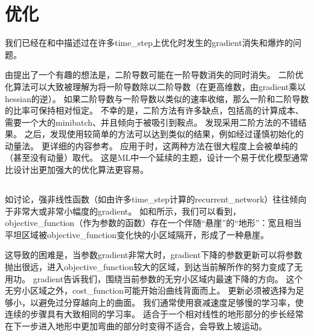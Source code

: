 \section{优化}
\label{sec:optimization_for_long_term_dependencies}
我们已经在和中描述过在许多\gls{time_step}上优化时发生的\gls{gradient}消失和爆炸的问题。

由\cite{Martens+Sutskever-ICML2011}提出了一个有趣的想法是，二阶导数可能在一阶导数消失的同时消失。
二阶优化算法可以大致被理解为将一阶导数除以二阶导数（在更高维数，由\gls{gradient}乘以\gls{hessian}的逆）。
如果二阶导数与一阶导数以类似的速率收缩，那么一阶和二阶导数的比率可保持相对恒定。
不幸的是，二阶方法有许多缺点，包括高的计算成本、需要一个大的\gls{minibatch}、并且倾向于被吸引到鞍点。
\cite{Martens+Sutskever-ICML2011}发现采用二阶方法的不错结果。
之后，\cite{sutskeverimportance}发现使用较简单的方法可以达到类似的结果，例如经过谨慎初始化的动量法。
更详细的内容参考\cite{Sutskever-thesis2012}。
应用于时，这两种方法在很大程度上会被单纯的（甚至没有动量）取代。
这是\gls{ML}中一个延续的主题，设计一个易于优化模型通常比设计出更加强大的优化算法更容易。


\subsection{}
\label{sec:clipping_gradients}
如讨论，强非线性函数（如由许多\gls{time_step}计算的\gls{recurrent_network}）往往倾向于非常大或非常小幅度的\gls{gradient}。
如和所示，我们可以看到，\gls{objective_function}（作为参数的函数）存在一个伴随``悬崖''的``地形''：宽且相当平坦区域被\gls{objective_function}变化快的小区域隔开，形成了一种悬崖。

这导致的困难是，当参数\gls{gradient}非常大时，\gls{gradient}下降的参数更新可以将参数抛出很远，进入\gls{objective_function}较大的区域，到达当前解所作的努力变成了无用功。
\gls{gradient}告诉我们，围绕当前参数的无穷小区域内最速下降的方向。
这个无穷小区域之外，\gls{cost_function}可能开始沿曲线背面而上。
更新必须被选择为足够小，以避免过分穿越向上的曲面。
我们通常使用衰减速度足够慢的学习率，使连续的步骤具有大致相同的学习率。
适合于一个相对线性的地形部分的步长经常在下一步进入地形中更加弯曲的部分时变得不适合，会导致上坡运动。

